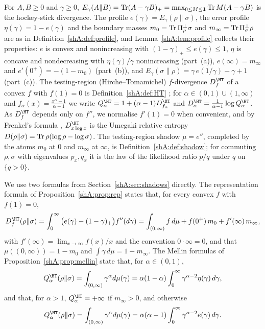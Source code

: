 For $A,B\ge0$ and $\gamma\ge0$, $E_\gamma(A\|B)=\operatorname{Tr}(A-\gamma B)_+=\max_{0\le M\le\mathbf 1}\operatorname{Tr} M(A-\gamma B)$ is the hockey-stick divergence. The profile $e(\gamma)=E_\gamma(\rho\|\sigma)$, the error profile $\eta(\gamma)=1-e(\gamma)$ and the boundary masses $m_0=\operatorname{Tr}\Pi_\rho^\perp\sigma$ and $m_\infty=\operatorname{Tr}\Pi_\sigma^\perp\rho$ are as in Definition~\ref{shA:def:profile}, and Lemma~\ref{shA:lem:profile} collects their properties: $e$ is convex and nonincreasing with $(1-\gamma)_+\le e(\gamma)\le1$, $\eta$ is concave and nondecreasing with $\eta(\gamma)/\gamma$ nonincreasing (part~(a)), $e(\infty)=m_\infty$ and $e'(0^+)=-(1-m_0)$ (part~(b)), and $E_\gamma(\sigma\|\rho)=\gamma\,e(1/\gamma)-\gamma+1$ (part~(c)). The testing-region (Hirche--Tomamichel) $f$-divergence $D^\HT_f$ of a convex $f$ with $f(1)=0$ is Definition~\ref{shA:def:HT} \cite{HircheTomamichel2024}; for $\alpha\in(0,1)\cup(1,\infty)$ and $f_\alpha(x)=\frac{x^\alpha-1}{\alpha-1}$ we write $Q^\HT_\alpha=1+(\alpha-1)D^\HT_{f_\alpha}$ and $D^\HT_\alpha=\frac{1}{\alpha-1}\log Q^\HT_\alpha$. As $D^\HT_f$ depends only on $f''$, we normalise $f'(1)=0$ when convenient, and by Frenkel's formula \cite{Frenkel2023}, $D^\HT_{x\log x}$ is the Umegaki relative entropy $D(\rho\|\sigma)=\operatorname{Tr}\rho(\log\rho-\log\sigma)$. The testing-region shadow $\mu=e''$, completed by the atoms $m_0$ at $0$ and $m_\infty$ at $\infty$, is Definition~\ref{shA:def:shadow}; for commuting $\rho,\sigma$ with eigenvalues $p_x,q_x$ it is the law of the likelihood ratio $p/q$ under $q$ on $\{q>0\}$.

We use two formulas from Section~\ref{shA:sec:shadows} directly. The representation formula of Proposition~\ref{shA:prop:rep} states that, for every convex $f$ with $f(1)=0$,
\[
D^\HT_f(\rho\|\sigma)=\int_0^\infty\big(e(\gamma)-(1-\gamma)_+\big)f''(d\gamma)=\int_{(0,\infty)}f\,d\mu+f(0^+)\,m_0+f'(\infty)\,m_\infty,
\]
with $f'(\infty)=\lim_{x\to\infty}f(x)/x$ and the convention $0\cdot\infty=0$, and that $\mu((0,\infty))=1-m_0$ and $\int\gamma\,d\mu=1-m_\infty$. The Mellin formulas of Proposition~\ref{shA:prop:mellin} state that, for $\alpha\in(0,1)$,
\[
Q^\HT_\alpha(\rho\|\sigma)=\int_{(0,\infty)}\gamma^\alpha d\mu(\gamma)=\alpha(1-\alpha)\int_0^\infty\gamma^{\alpha-2}\eta(\gamma)\,d\gamma ,
\]
and that, for $\alpha>1$, $Q^\HT_\alpha=+\infty$ if $m_\infty>0$, and otherwise
\[
Q^\HT_\alpha(\rho\|\sigma)=\int_{(0,\infty)}\gamma^\alpha d\mu(\gamma)=\alpha(\alpha-1)\int_0^\infty\gamma^{\alpha-2}e(\gamma)\,d\gamma .
\]

